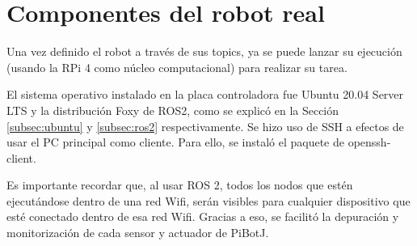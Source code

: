 
\section{Componentes del robot real}
\label{sec:configrf}

Una vez definido el robot a través de sus topics, ya se puede lanzar su ejecución (usando la RPi 4 como núcleo computacional) para realizar su tarea.

El sistema operativo instalado en la placa controladora fue Ubuntu 20.04 Server \acs{LTS} y la distribución Foxy de ROS2, como se explicó en la Sección \ref{subsec:ubuntu} y \ref{subsec:ros2} respectivamente. Se hizo uso de SSH a efectos de usar el PC principal como cliente. Para ello, se instaló el paquete de openssh-client.



Es importante recordar que, al usar ROS 2, todos los nodos que estén ejecutándose dentro de una red Wifi, serán visibles para cualquier dispositivo que esté conectado dentro de esa red Wifi. Gracias a eso, se facilitó la depuración y monitorización de cada sensor y actuador de PiBotJ. 

